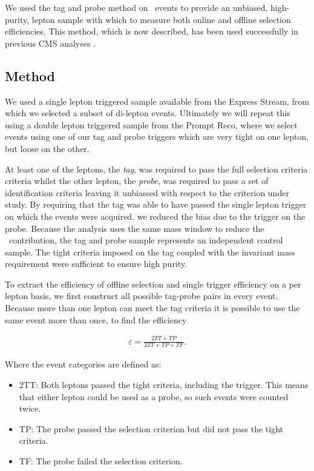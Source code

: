  
We used the tag and probe method on \dyll~events to provide an unbiased, high-purity, 
lepton sample with which to measure both online and offline selection efficiencies.
This method, which is now described, 
has been used successfully in previous CMS analyses \cite{ref:tagprobe_mit_w}\cite{ref:tagprobe_snt_top}.

\subsection{Method}
We used a single lepton triggered sample available from the Express Stream, 
from which we selected a subset of di-lepton events.
Ultimately we will repeat this using a double lepton triggered sample from the Prompt Reco,
where we select events using one of our tag and probe triggers which are very tight on one lepton,
but loose on the other.

At least one of the leptons, the {\it tag}, was required to pass the full selection criteria criteria 
whilst the other lepton, the {\it probe}, was required to pass a set of identification criteria leaving 
it unbiassed with respect to the criterion under study. 
By requiring that the tag was able to have passed the single lepton trigger on which the events were acquired, 
we reduced the bias due to the trigger on the probe.
Because the analysis uses the same mass window to reduce the \dyll~contribution, 
the tag and probe sample represents an independent control sample.
The tight criteria imposed on the tag coupled with the invariant mass requirement were sufficient to ensure high purity.

To extract the efficiency of offline selection and single trigger efficiency on a per lepton basis, 
we first construct all possible tag-probe pairs in every event.
Because more than one lepton can meet the tag criteria it is possible to use the same event more than once, to find the efficiency

\begin{eqnarray}
\label{eqn:tagAndProbeEfficiencyEqn}
\varepsilon = \frac{2TT + TP}{2TT + TP + TF}.
\end{eqnarray}

Where the event categories are defined as:

\begin{itemize}
	\item 2TT: Both leptons passed the tight criteria, including the trigger. This means that either lepton could be used as a probe, 
	so such events were counted twice.
	\item TP: The probe passed the selection criterion but did not pass the tight criteria.
	\item TF: The probe failed the selection criterion.
\end{itemize}

